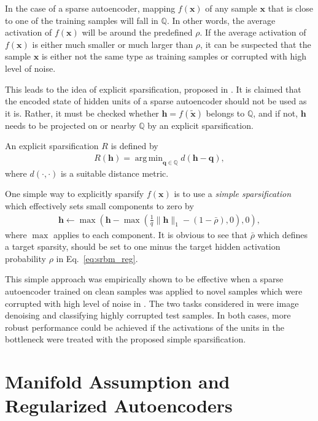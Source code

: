 \documentclass[dissertation,nocontribution,draft*]{aaltoseries}
\newcommand{\vect}[1]{\mathbf{#1}}
\newcommand{\vh}[0]{\vect{h}}
\newcommand{\vx}[0]{\vect{x}}
\newcommand{\vq}[0]{\vect{q}}
\newcommand{\QQ}[0]{\mathbb{Q}}
\DeclareMathOperator*{\argmin}{arg\,min}
\begin{document}
In the case of a sparse autoencoder, mapping $f(\vx)$ of any
sample $\vx$ that is close to one of the training samples will
fall in $\QQ$. In other words, the average activation of
$f(\vx)$ will be around the predefined $\rho$. If the
average activation of $f(\vx)$ is either much smaller or
much larger than $\rho$, it can be suspected that the sample
$\vx$ is either not the same type as training samples or
corrupted with high level of noise.

This leads to the idea of explicit sparsification, proposed
in . It is claimed that the encoded
state of hidden units of a sparse autoencoder should not be
used as it is. Rather, it must be checked whether $\vh =
f(\tilde{\vx})$ belongs to $\QQ$, and if not, $\vh$ needs to
be projected on or nearby $\QQ$ by an explicit
sparsification.

An explicit sparsification $R$ is defined by 
\begin{align}
    \label{eq:esp}
    R(\vh) = \argmin_{\vq \in \QQ} d(\vh - \vq),
\end{align}
where $d(\cdot, \cdot)$ is a suitable distance metric.

One simple way to explicitly sparsify $f(\vx)$ is to use a
\textit{simple sparsification} which effectively sets small
components to zero by
\begin{align}
    \label{eq:simple_sparsification}
    \vh \leftarrow \max\left(\vh - \max\left(\frac{1}{q}
    \|\vh\|_1 - \left(1 - \bar{\rho}\right), 0\right),
    0\right),
\end{align}
where $\max$ applies to each component. It is obvious to see
that $\bar{\rho}$ which defines a target sparsity, should be
set to one minus the target hidden activation probability
$\rho$ in Eq.~\eqref{eq:srbm_reg}.

This simple approach was empirically shown to be effective
when a sparse autoencoder trained on clean samples was
applied to novel samples which were corrupted with high
level of noise in . The two tasks
considered in  were image
denoising and classifying highly corrupted test
samples. In both cases, more robust performance could be
achieved if the activations of the units in the bottleneck
were treated with the proposed simple sparsification.

\section{Manifold Assumption and Regularized Autoencoders}
\label{sec:dae_cae}
\end{document}
